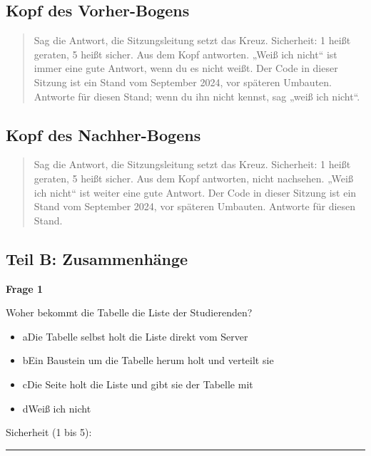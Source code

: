 \subsection*{Kopf des Vorher-Bogens}

\begin{quote}
Sag die Antwort, die Sitzungsleitung setzt das Kreuz. Sicherheit: 1 heißt geraten, 5 heißt sicher. Aus dem Kopf antworten. „Weiß ich nicht“ ist immer eine gute Antwort, wenn du es nicht weißt. Der Code in dieser Sitzung ist ein Stand vom September 2024, vor späteren Umbauten. Antworte für diesen Stand; wenn du ihn nicht kennst, sag „weiß ich nicht“.

\end{quote}

\subsection*{Kopf des Nachher-Bogens}

\begin{quote}
Sag die Antwort, die Sitzungsleitung setzt das Kreuz. Sicherheit: 1 heißt geraten, 5 heißt sicher. Aus dem Kopf antworten, nicht nachsehen. „Weiß ich nicht“ ist weiter eine gute Antwort. Der Code in dieser Sitzung ist ein Stand vom September 2024, vor späteren Umbauten. Antworte für diesen Stand.

\end{quote}

\subsection*{Teil B: Zusammenhänge}

\noindent\begin{minipage}{\linewidth}
\textbf{Frage 1}\par
Woher bekommt die Tabelle die Liste der Studierenden?

\begin{itemize}[nosep,leftmargin=2.4em]
\item[\kreuz] a\quad Die Tabelle selbst holt die Liste direkt vom Server
\item[\kreuz] b\quad Ein Baustein um die Tabelle herum holt und verteilt sie
\item[\kreuz] c\quad Die Seite holt die Liste und gibt sie der Tabelle mit
\item[\kreuz] d\quad Weiß ich nicht
\end{itemize}
\noindent Sicherheit (1 bis 5):~\rule{2.5em}{0.4pt}\par
\end{minipage}

